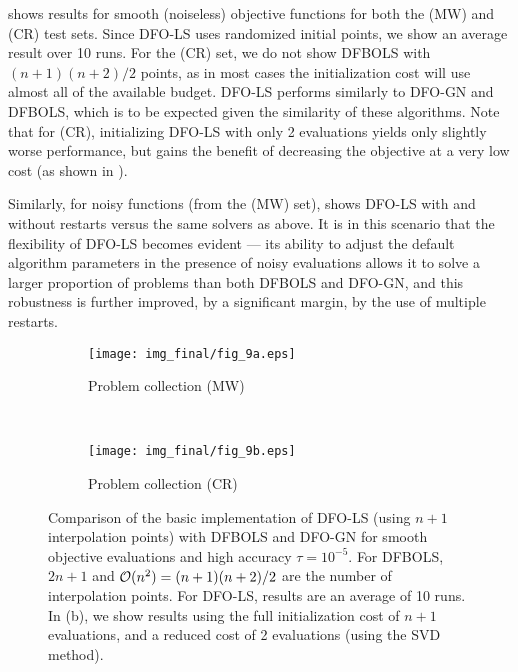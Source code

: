  shows results for smooth (noiseless) objective functions for both the (MW) and (CR) test sets.
Since DFO-LS uses randomized initial points, we show an average result over 10 runs.
For the (CR) set, we do not show DFBOLS with $(n+1)(n+2)/2$ points, as in most cases the initialization cost will use almost all of the available budget.
DFO-LS performs similarly to DFO-GN and DFBOLS, which is to be expected given the similarity of these algorithms.
Note that for (CR), initializing DFO-LS with only 2 evaluations yields only slightly worse performance, but gains the benefit of decreasing the objective at a very low cost (as shown in ).

Similarly, for noisy functions (from the (MW) set),
 shows DFO-LS with and without restarts versus the same solvers as above. 
It is in this scenario that the flexibility of DFO-LS becomes evident --- its ability to adjust the default algorithm parameters in the presence of noisy evaluations allows it to solve a larger proportion of problems than both DFBOLS and DFO-GN, and this robustness is further improved, by a significant margin, by the use of multiple restarts.

\begin{figure}
	\centering
	\begin{subfigure}[b]{0.48\textwidth}
		\texttt{[image: img\_final/fig\_9a.eps]}
		\caption{Problem collection (MW)}
		\label{fig_basic_smooth_data}
	\end{subfigure}
	~
	\begin{subfigure}[b]{0.48\textwidth}
		\texttt{[image: img\_final/fig\_9b.eps]}
		\caption{Problem collection (CR)}
		\label{fig_basic_cutest_smooth_data}
	\end{subfigure}
	\caption{Comparison of the basic implementation of DFO-LS (using $n+1$ interpolation points) with DFBOLS and DFO-GN for smooth objective evaluations and high accuracy $\tau=10^{-5}$. For DFBOLS, $2n+1$ and $\mathcal{O}(n^2)=(n+1)(n+2)/2$ are the number of interpolation points. For DFO-LS, results are an average of 10 runs. In (b), we show results using the full initialization cost of $n+1$ evaluations, and a reduced cost of 2 evaluations (using the SVD method).}
	\label{fig_basic_smooth}
\end{figure}

